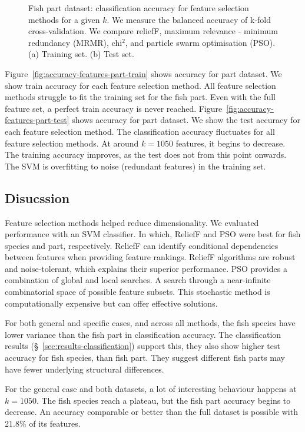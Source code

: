 \documentclass[runningheads]{llncs}
\begin{document}
\begin{figure}[htb]
  \caption[Two numerical solutions]{
    Fish part dataset: classification accuracy for feature selection methods for a given $k$.
    We measure the balanced accuracy of k-fold cross-validation.
    We compare reliefF, maximum relevance - minimum redundancy (MRMR), chi$^2$, and particle swarm optimisation (PSO).
    (a) Training set. (b) Test set.}
\end{figure}

Figure~\ref{fig:accuracy-features-part-train} shows accuracy for part dataset.
We show train accuracy for each feature selection method.
All feature selection methods struggle to fit the training set for the fish part.
Even with the full feature set, a perfect train accuracy is never reached.
Figure~\ref{fig:accuracy-features-part-test} shows accuracy for part dataset.
We show the test accuracy for each feature selection method.
The classification accuracy fluctuates for all feature selection methods.
At around $k=1050$ features, it begins to decrease.
The training accuracy improves, as the test does not from this point onwards.
The SVM is overfitting to noise (redundant features) in the training set.

\subsection{Disucssion}
\label{sec:results-feature-selection-discussion}

Feature selection methods helped reduce dimensionality.
We evaluated performance with an SVM classifier.
In which, ReliefF and PSO were best for fish species and part, respectively.
ReliefF can identify conditional dependencies between features when providing feature rankings.
ReliefF algorithms are robust and noise-tolerant, which explains their superior performance.
PSO provides a combination of global and local searches.
A search through a near-infinite combinatorial space of possible feature subsets.
This stochastic method is computationally expensive but can offer effective solutions.

For both general and specific cases, and across all methods, the fish species have lower variance than the fish part in classification accuracy.
The classification results (\S~\ref{sec:results-classification}) support this, they also show higher test accuracy for fish species, than fish part.
They suggest different fish parts may have fewer underlying structural differences.

For the general case and both datasets, a lot of interesting behaviour happens at $k=1050$.
The fish species reach a plateau, but the fish part accuracy begins to decrease.
An accuracy comparable or better than the full dataset is possible with 21.8\% of its features.
\end{document}
